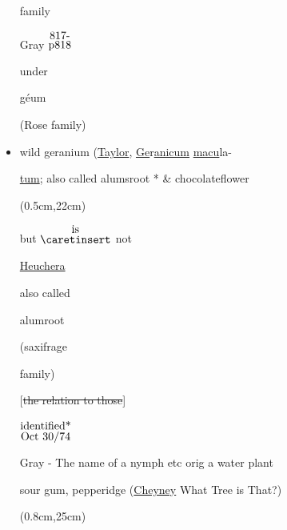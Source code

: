 \documentclass[a4paper,10pt]{article}
\begin{document}
\begin{flushleft}
\begin{itemize}
\begin{minipage}{2in}
    family
\end{minipage}%
\hfill
\begin{minipage}{0.6in}
    Gray $\stackrel{\hbox{817-}}{\hbox{p818}}$ 
\end{minipage}%
\begin{minipage}{0.7in}
    under\par
    g\'eum\par
    (Rose family)
\end{minipage}%
\color{blue}
\normalsize
\item wild geranium (\ul{Taylor}, \ul{Ge}r\ul{anicum} \ul{macu}la-\par
\ul{tum}; also called alumsroot
\color{red}
* 
\color{blue}
\& chocolateflower\par
{}
\color{red}
\begin{textblock*}{3.22in}(0.5cm,22cm)%
    \small
    \begin{minipage}{3.22in} 
        \color{red}
        but $\stackrel{\hbox{is}}{\hbox{$\caretinsert$}}$ not\par
        \ul{Heuchera}\par
        also called\par
         alumroot\par
        (saxifrage\par
        family)
        \normalsize
  \end{minipage}%
  \end{textblock*}%
\color{blue}
[\st{the relation to those}]
{$\stackrel{\hbox{identified*}}{\hbox{Oct 30/74}}$}\par
[*neighbor called it wild strawberry, but\par 
no berry]\par
Gray - The name of a nymph etc orig a water plant\par 
sour gum, pepperidge \color{red} (\ul{Cheyney} What Tree is That?)
\begin{textblock*}{2in}(0.8cm,25cm)%

\end{textblock*}
\end{itemize}
\end{flushleft}
\end{document}
